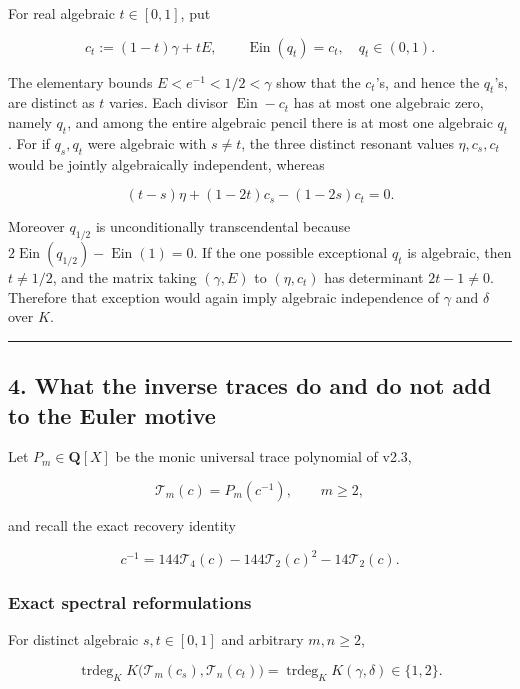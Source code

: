 \documentclass[11pt]{article}
\theoremstyle{keio}
\theoremstyle{definition}
\theoremstyle{remark}
\newcommand{\Ein}{\operatorname{Ein}}
\begin{document}
For real algebraic \(t\in[0,1]\), put

\[
 c_t:=(1-t)\gamma+tE,
 \qquad \Ein(q_t)=c_t,\quad q_t\in(0,1).                                    \tag{GT-16}
\]

The elementary bounds \(E<e^{-1}<1/2<\gamma\) show that the \(c_t\)'s,
and hence the \(q_t\)'s, are distinct as \(t\) varies. Each divisor
\(\Ein-c_t\) has at most one algebraic zero, namely \(q_t\), and among the
entire algebraic pencil there is at most one algebraic \(q_t\). For if
\(q_s,q_t\) were algebraic with \(s\ne t\), the three distinct resonant
values \(\eta,c_s,c_t\) would be jointly algebraically independent, whereas

\[
 (t-s)\eta+(1-2t)c_s-(1-2s)c_t=0.                                          \tag{GT-17}
\]

Moreover \(q_{1/2}\) is unconditionally transcendental because
\(2\Ein(q_{1/2})-\Ein(1)=0\). If the one possible exceptional \(q_t\) is
algebraic, then \(t\ne1/2\), and the matrix taking
\((\gamma,E)\) to \((\eta,c_t)\) has determinant \(2t-1\ne0\). Therefore
that exception would again imply algebraic independence of \(\gamma\) and
\(\delta\) over \(K\).

\begin{center}\rule{0.5\linewidth}{0.5pt}\end{center}

\subsection{4. What the inverse traces do and do not add to the Euler motive}

Let \(P_m\in\mathbf Q[X]\) be the monic universal trace polynomial of v2.3,

\[
 \mathcal T_m(c)=P_m(c^{-1}),\qquad m\ge2,
\]

and recall the exact recovery identity

\[
 c^{-1}=144\mathcal T_4(c)-144\mathcal T_2(c)^2-14\mathcal T_2(c).          \tag{GT-18}
\]

\subsubsection{Exact spectral reformulations}

For distinct algebraic \(s,t\in[0,1]\) and arbitrary \(m,n\ge2\),

\[
 \boxed{
 \operatorname{trdeg}_K
 K\bigl(\mathcal T_m(c_s),\mathcal T_n(c_t)\bigr)
 =\operatorname{trdeg}_K K(\gamma,\delta)\in\{1,2\}.}                     \tag{GT-19}
\]
\end{document}
